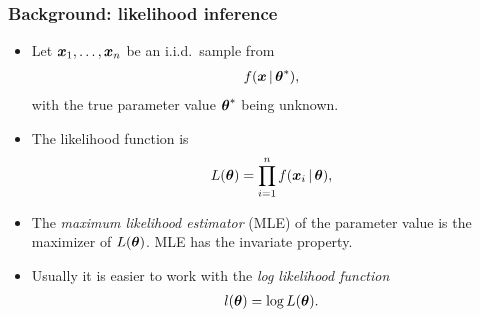   \begin{frame}
  \frametitle{Background: likelihood inference}
    \begin{itemize}
        \item Let ${\boldsymbol{x}}_1, \ldots, {\boldsymbol{x}}_{n}$ be an i.i.d.\ sample from
            \begin{align*}
            f(\boldsymbol{x}\,|\, \boldsymbol{\theta}^*),
            \end{align*}
            with the true parameter value $\boldsymbol{\theta}^*$ being unknown.

        \item The likelihood function is
            \begin{align*}
            L(\boldsymbol{\theta}) = \prod_{i=1}^n f(\boldsymbol{x}_i\,|\, \boldsymbol{\theta}),
            \end{align*}

        \item The \emph{maximum likelihood estimator\/} (MLE) of the parameter value is the maximizer of $L(\boldsymbol{\theta})$. MLE has the invariate property.

        \item Usually it is easier to work with the \emph{log likelihood function\/}
            \begin{align*}
            l(\boldsymbol{\theta}) = \log L(\boldsymbol{\theta}).
            \end{align*}
      \end{itemize}

  \end{frame}

